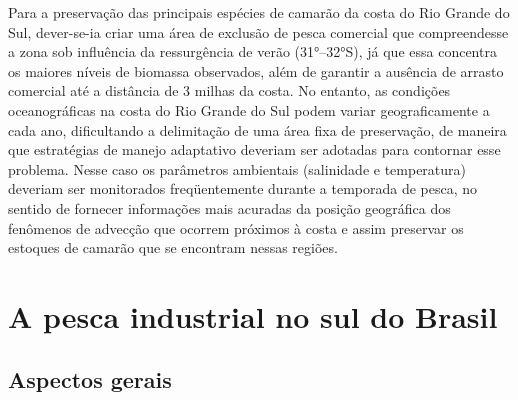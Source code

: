 \documentclass[a4paper,11pt,twoside,showtrims,onecolumn,openright,final]{memoir}
\begin{document}
Para a preservação das principais espécies de camarão da costa do Rio Grande do Sul, 
dever-se-ia criar uma área de exclusão de pesca comercial que compreendesse a zona 
sob influência da ressurgência de verão (31°--32°S), já que essa concentra os maiores 
níveis de biomassa observados, além de garantir a ausência de arrasto comercial até a 
distância de 3 milhas da costa. No entanto, as condições oceanográficas na costa do 
Rio Grande do Sul podem variar geograficamente a cada ano, dificultando a delimitação 
de uma área fixa de preservação, de maneira que estratégias de manejo adaptativo deveriam 
ser adotadas para contornar esse problema. Nesse caso os parâmetros ambientais 
(salinidade e temperatura) deveriam ser monitorados freqüentemente durante a temporada 
de pesca, no sentido de fornecer informações mais acuradas da posição geográfica dos fenômenos 
de advecção que ocorrem próximos à costa e assim preservar os estoques de camarão 
que se encontram nessas regiões.



\chapter{A pesca industrial no sul do Brasil}\label{chap:pesca-industrial}




\newpage

\section*{Aspectos gerais}
\end{document}
